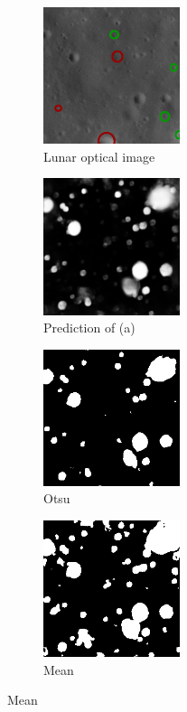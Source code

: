 \documentclass[11pt]{article}
\begin{document}
\begin{figure}[H]
	\begin{subfigure}{5cm}
		\centering\includegraphics[width=4cm]{files/results/un_detected.png}\hfill
		\caption{Lunar optical image}\hfill
	\end{subfigure}
	\begin{subfigure}{5cm}
		\centering\includegraphics[width=4cm]{files/results/26_predict.png}\hfill
		\caption{Prediction of (a)}\hfill
	\end{subfigure}
	\begin{subfigure}{5cm}
		\centering\includegraphics[width=4cm]{files/results/otsu.png}\hfill
		\caption{Otsu}\hfill
	\end{subfigure}
	\begin{subfigure}{5cm}
		\centering\includegraphics[width=4cm]{files/results/mean.png}\hfill
		\caption{Mean}\hfill
	\end{subfigure}

\end{figure}
\end{document}
